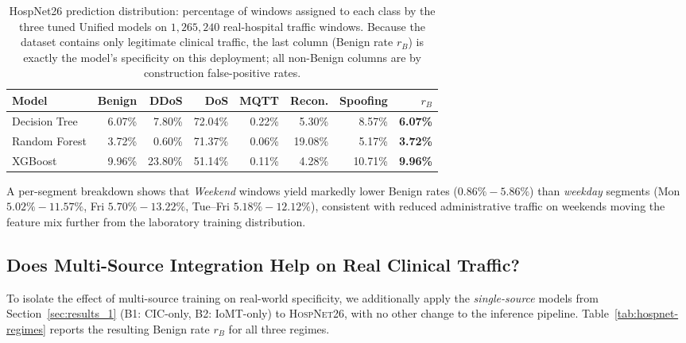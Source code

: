\documentclass[runningheads]{llncs}
\begin{document}
\begin{table}[H]
\centering
\caption{HospNet26 prediction distribution: percentage of windows assigned to each class by the three tuned Unified models on $1{,}265{,}240$ real-hospital traffic windows. Because the dataset contains only legitimate clinical traffic, the last column (Benign rate $r_{B}$) is exactly the model's specificity on this deployment; all non-Benign columns are by construction false-positive rates.}\label{tab:hospnet}
\small
\begin{tabular}{@{}lrrrrrr|r@{}}
\toprule
\textbf{Model} & \textbf{Benign} & \textbf{DDoS} & \textbf{DoS} & \textbf{MQTT} & \textbf{Recon.} & \textbf{Spoofing} & \textbf{$r_{B}$} \\
\midrule
Decision Tree & 6.07\% &  7.80\% & 72.04\% & 0.22\% &  5.30\% &  8.57\% & \textbf{6.07\%} \\
Random Forest & 3.72\% &  0.60\% & 71.37\% & 0.06\% & 19.08\% &  5.17\% & \textbf{3.72\%} \\
XGBoost       & 9.96\% & 23.80\% & 51.14\% & 0.11\% &  4.28\% & 10.71\% & \textbf{9.96\%} \\
\bottomrule
\end{tabular}
\end{table}

A per-segment breakdown shows that \emph{Weekend} windows yield markedly lower Benign rates ($0.86\%\!-\!5.86\%$) than \emph{weekday} segments (Mon $5.02\%\!-\!11.57\%$, Fri $5.70\%\!-\!13.22\%$, Tue--Fri $5.18\%\!-\!12.12\%$), consistent with reduced administrative traffic on weekends moving the feature mix further from the laboratory training distribution.

\subsection{Does Multi-Source Integration Help on Real Clinical Traffic?}
\label{subsec:hospnet-regimes}

To isolate the effect of multi-source training on real-world specificity, we additionally apply the \emph{single-source} models from Section~\ref{sec:results_1} (B1: CIC-only, B2: IoMT-only) to \textsc{HospNet26}, with no other change to the inference pipeline. Table~\ref{tab:hospnet-regimes} reports the resulting Benign rate $r_{B}$ for all three regimes.
\end{document}
